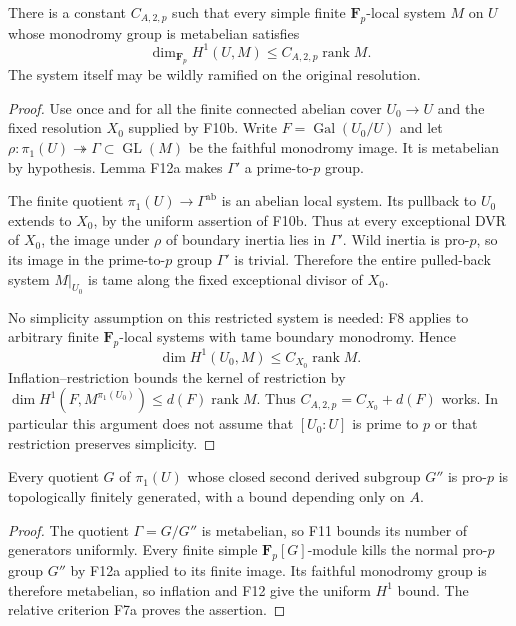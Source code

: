 \begin{proposition}
There is a constant $C_{A,2,p}$ such that every simple finite
$\mathbf F_p$-local system $M$ on $U$ whose monodromy group is
metabelian satisfies
\[
                    \dim_{\mathbf F_p}H^1(U,M)
                    \leq C_{A,2,p}\operatorname{rank}M.
 \tag{F12.1}
\]
The system itself may be wildly ramified on the original resolution.
\end{proposition}
\begin{proof}
Use once and for all the finite connected abelian cover
$U_0\to U$ and the fixed resolution $X_0$ supplied by F10b.
Write $F=\operatorname{Gal}(U_0/U)$ and let
$\rho:\pi_1(U)\twoheadrightarrow\Gamma\subset\operatorname{GL}(M)$ be the
faithful monodromy image. It is metabelian by hypothesis.
Lemma F12a makes $\Gamma'$ a prime-to-$p$ group.

The finite quotient $\pi_1(U)\to\Gamma^{\mathrm{ab}}$ is an
abelian local system. Its pullback to $U_0$ extends to $X_0$,
by the uniform assertion of F10b. Thus at every exceptional
DVR of $X_0$, the image under $\rho$ of boundary inertia lies
in $\Gamma'$. Wild inertia is pro-$p$, so its image in the
prime-to-$p$ group $\Gamma'$ is trivial. Therefore the entire
pulled-back system $M|_{U_0}$ is tame along the fixed exceptional
divisor of $X_0$.

No simplicity assumption on this restricted system is needed:
F8 applies to arbitrary finite $\mathbf F_p$-local systems with
tame boundary monodromy. Hence
\[
 \dim H^1(U_0,M)\leq C_{X_0}\operatorname{rank}M.
\]
Inflation--restriction bounds the kernel of restriction by
$\dim H^1(F,M^{\pi_1(U_0)})\leq d(F)\operatorname{rank}M$.
Thus $C_{A,2,p}=C_{X_0}+d(F)$ works. In particular this argument
does not assume that $[U_0:U]$ is prime to $p$ or that restriction
preserves simplicity.
\end{proof}

\begin{corollary}
Every quotient $G$ of $\pi_1(U)$ whose closed second derived
subgroup $G''$ is pro-$p$ is topologically finitely generated,
with a bound depending only on $A$.
\end{corollary}
\begin{proof}
The quotient $\Gamma=G/G''$ is metabelian, so F11 bounds its
number of generators uniformly. Every finite simple
$\mathbf F_p[G]$-module kills the normal pro-$p$ group $G''$ by
F12a applied to its finite image. Its faithful monodromy group
is therefore metabelian, so inflation and F12 give the uniform
$H^1$ bound. The relative criterion F7a proves the assertion.
\end{proof}

